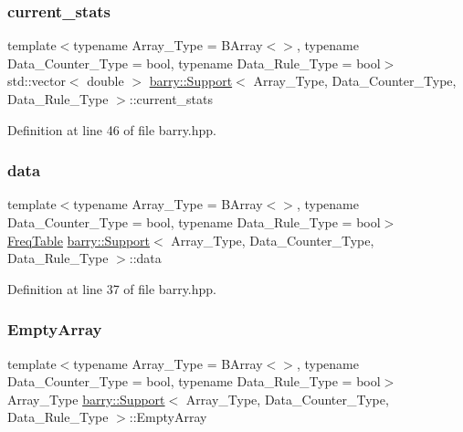 \subsubsection{\texorpdfstring{current\+\_\+stats}{current\_stats}}
{\footnotesize\ttfamily template$<$typename Array\+\_\+\+Type = B\+Array$<$$>$, typename Data\+\_\+\+Counter\+\_\+\+Type = bool, typename Data\+\_\+\+Rule\+\_\+\+Type = bool$>$ \\
std\+::vector$<$ double $>$ \hyperlink{classbarry_1_1_support}{barry\+::\+Support}$<$ Array\+\_\+\+Type, Data\+\_\+\+Counter\+\_\+\+Type, Data\+\_\+\+Rule\+\_\+\+Type $>$\+::current\+\_\+stats}



Definition at line 46 of file barry.\+hpp.

\mbox{\label{classbarry_1_1_support_ab58b9801dcbb924d68fd18db0821de99}} 
\subsubsection{\texorpdfstring{data}{data}}
{\footnotesize\ttfamily template$<$typename Array\+\_\+\+Type = B\+Array$<$$>$, typename Data\+\_\+\+Counter\+\_\+\+Type = bool, typename Data\+\_\+\+Rule\+\_\+\+Type = bool$>$ \\
\hyperlink{classbarry_1_1_freq_table}{Freq\+Table} \hyperlink{classbarry_1_1_support}{barry\+::\+Support}$<$ Array\+\_\+\+Type, Data\+\_\+\+Counter\+\_\+\+Type, Data\+\_\+\+Rule\+\_\+\+Type $>$\+::data}



Definition at line 37 of file barry.\+hpp.

\mbox{\label{classbarry_1_1_support_a2eec6569a9206965a679782f7acf12e5}} 
\subsubsection{\texorpdfstring{Empty\+Array}{EmptyArray}}
{\footnotesize\ttfamily template$<$typename Array\+\_\+\+Type = B\+Array$<$$>$, typename Data\+\_\+\+Counter\+\_\+\+Type = bool, typename Data\+\_\+\+Rule\+\_\+\+Type = bool$>$ \\
Array\+\_\+\+Type \hyperlink{classbarry_1_1_support}{barry\+::\+Support}$<$ Array\+\_\+\+Type, Data\+\_\+\+Counter\+\_\+\+Type, Data\+\_\+\+Rule\+\_\+\+Type $>$\+::Empty\+Array}



